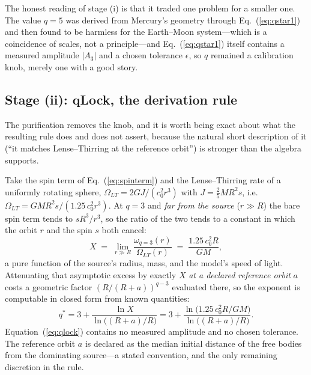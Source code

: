\documentclass[aps,reprint,amsmath,amssymb,nofootinbib,superscriptaddress,floatfix]{revtex4-2}
\begin{document}
The honest reading of stage (i) is that it traded one problem for a
smaller one.
The value $q=5$ was derived from Mercury's geometry through
Eq.~(\ref{eq:qstar1}) and then found to be harmless for the
Earth--Moon system---which is a coincidence of scales, not a
principle---and Eq.~(\ref{eq:qstar1}) itself contains a measured
amplitude $|A_3|$ and a chosen tolerance $\epsilon$, so $q$ remained a
calibration knob, merely one with a good story.

\subsection{Stage (ii): qLock, the derivation rule}
\label{sec:qlock}

The purification removes the knob, and it is worth being exact about
what the resulting rule does and does not assert, because the natural
short description of it (``it matches Lense--Thirring at the reference
orbit'') is stronger than the algebra supports.

Take the spin term of Eq.~(\ref{eq:spinterm}) and the Lense--Thirring
rate of a uniformly rotating sphere, $\Omega_{LT}=2GJ/(c_0^{2}r^{3})$
with $J=\tfrac{2}{5}MR^{2}s$, i.e.
$\Omega_{LT}=GMR^{2}s/(1.25\,c_0^{2}r^{3})$.
At $q=3$ and \emph{far from the source} ($r\gg R$) the bare spin term
tends to $sR^{3}/r^{3}$, so the ratio of the two tends to a constant in
which the orbit $r$ and the spin $s$ both cancel:
\begin{equation}
  X \;=\; \lim_{r\gg R}\frac{\omega_{q=3}(r)}{\Omega_{LT}(r)}
    \;=\; \frac{1.25\,c_0^{2}R}{GM},
  \label{eq:X}
\end{equation}
a pure function of the source's radius, mass, and the model's speed of
light.
Attenuating that asymptotic excess by exactly $X$ \emph{at a declared
reference orbit} $a$ costs a geometric factor $(R/(R+a))^{q-3}$
evaluated there, so the exponent is computable in closed form from
known quantities:
\begin{equation}
  q^{*} = 3+\frac{\ln X}{\ln\bigl((R+a)/R\bigr)}
        = 3+\frac{\ln\bigl(1.25\,c_0^{2}R/GM\bigr)}
                 {\ln\bigl((R+a)/R\bigr)} .
  \label{eq:qlock}
\end{equation}
Equation~(\ref{eq:qlock}) contains no measured amplitude and no chosen
tolerance.
The reference orbit $a$ is declared as the median initial distance of
the free bodies from the dominating source---a stated convention, and
the only remaining discretion in the rule.
\end{document}
